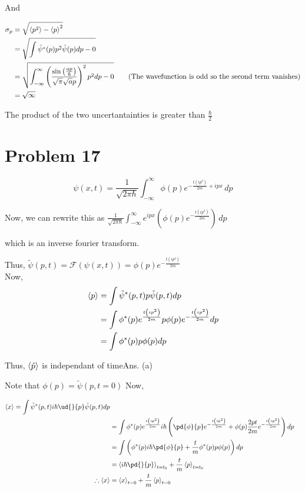 \documentclass[12pt]{article}
\begin{document}
And

\begin{align*}\sigma_p&=\sqrt{\Braket{p^2}-\Braket{p}^2}\\
&=\sqrt{\int \tilde{\psi}^*(p)p^2\tilde{\psi}(p)dp-0}\\
&= \sqrt{\int_{-\infty}^\infty \left(\frac{\sin \left(\frac{a p}{\hbar }\right)}{\sqrt{\pi } \sqrt{a} p}\right)^2 p^2 dp - 0}\qquad\text{(The wavefunction is odd so the second term vanishes)}\\
&=\sqrt{\infty}
\end{align*}

The product of the two uncertantainties is greater than $\frac\hbar2$
\section*{Problem 17}

$$\psi(x,t)=\frac{1}{\sqrt{2 \pi  \hbar }}\int_{-\infty }^{\infty }  \phi(p)  e^{-\frac{t \left(i p^2\right)}{2 m}+i p x} \, dp$$

Now, we can rewrite this as $\frac{1}{\sqrt{2 \pi  \hbar }}\int_{-\infty }^{\infty } e^{i p x} \left(\phi(p)  e^{-\frac{t \left(i p^2\right)}{2 m}}\right) \, dp$

which is an inverse fourier transform.

Thus, $\tilde{\psi}(p,t)=\mathcal F(\psi(x,t))=\phi(p)  e^{-\frac{t \left(i p^2\right)}{2 m}}$\\
Now,
\begin{align*}
\Braket{p}&=\int \tilde{\psi}^*(p,t)p\tilde{\psi}(p,t)dp\\
&=\int \phi^*(p)  e^{\frac{t \left(i p^2\right)}{2 m}}p\phi(p)  e^{-\frac{t \left(i p^2\right)}{2 m}}dp\\
&= \int \phi^*(p) p \phi(p) dp
\end{align*}

Thus, $\Braket{\hat p}$ is independant of time\hfill Ans. (a)

Note that $\phi(p)=\tilde{\psi}(p,t=0)$
Now, 

\begin{align*}
\Braket{x}= \int \tilde{\psi}^*(p,t)i\hbar\ud{}{p}\tilde{\psi}(p,t)dp\\
&=\int \phi^*(p)e^{\frac{t \left(i p^2\right)}{2 m}}i\hbar\left(\pd{\phi}{p}e^{-\frac{t \left(i p^2\right)}{2 m}}+\phi(p)\frac{2pt}{2m}e^{-\frac{t \left(i p^2\right)}{2 m}}\right)dp\\
&=\int\left( \phi^*(p)i\hbar\pd{\phi}{p} + \frac{t}{m}\phi^*(p)p\phi(p)\right) dp\\
&= \Braket{i\hbar\pd{}{p}}_{t=t_0} + \frac{t}{m}\Braket{p}_{t=t_0}\\
\therefore \Braket{x}&=\Braket{x}_{t=0} + \frac{t}{m}\Braket{p}_{t=0}
\end{align*}
\end{document}
